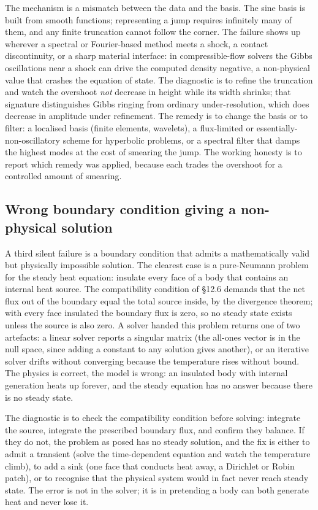 The mechanism is a mismatch between the data and the basis. The
sine basis is built from smooth functions; representing a jump
requires infinitely many of them, and any finite truncation cannot
follow the corner. The failure shows up wherever a spectral or
Fourier-based method meets a shock, a contact discontinuity, or a
sharp material interface: in compressible-flow solvers the Gibbs
oscillations near a shock can drive the computed density negative,
a non-physical value that crashes the equation of state. The
diagnostic is to refine the truncation and watch the overshoot
\emph{not} decrease in height while its width shrinks; that
signature distinguishes Gibbs ringing from ordinary
under-resolution, which does decrease in amplitude under refinement.
The remedy is to change the basis or to filter: a localised basis
(finite elements, wavelets), a flux-limited or essentially-
non-oscillatory scheme for hyperbolic problems, or a spectral filter
that damps the highest modes at the cost of smearing the jump. The
working honesty is to report which remedy was applied, because each
trades the overshoot for a controlled amount of smearing.

\subsection{Wrong boundary condition giving a non-physical solution}

A third silent failure is a boundary condition that admits a
mathematically valid but physically impossible solution. The
clearest case is a pure-Neumann problem for the steady heat
equation: insulate every face of a body that contains an internal
heat source. The compatibility condition of \S12.6 demands that the
net flux out of the boundary equal the total source inside, by the
divergence theorem; with every face insulated the boundary flux is
zero, so no steady state exists unless the source is also zero. A
solver handed this problem returns one of two artefacts: a linear
solver reports a singular matrix (the all-ones vector is in the null
space, since adding a constant to any solution gives another), or an
iterative solver drifts without converging because the temperature
rises without bound. The physics is correct, the model is wrong: an
insulated body with internal generation heats up forever, and the
steady equation has no answer because there is no steady state.

The diagnostic is to check the compatibility condition before
solving: integrate the source, integrate the prescribed boundary
flux, and confirm they balance. If they do not, the problem as
posed has no steady solution, and the fix is either to admit a
transient (solve the time-dependent equation and watch the
temperature climb), to add a sink (one face that conducts heat
away, a Dirichlet or Robin patch), or to recognise that the
physical system would in fact never reach steady state. The error
is not in the solver; it is in pretending a body can both generate
heat and never lose it.

